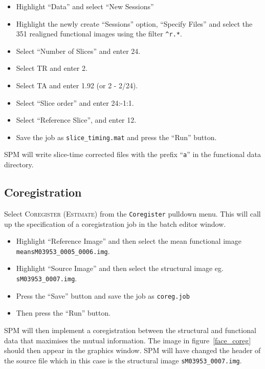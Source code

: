 \begin{itemize}
\item Highlight ``Data'' and select ``New Sessions''
\item Highlight the newly create ``Sessions'' option, ``Specify Files'' and select the 351 realigned functional images using the filter \texttt{\textasciicircum r.*}.
\item Select ``Number of Slices'' and enter 24.
\item Select TR and enter 2.
\item Select TA and enter 1.92 (or 2 - 2/24).
\item Select ``Slice order'' and enter 24:-1:1.
\item Select ``Reference Slice'', and enter 12.
\item Save the job as \texttt{slice\_timing.mat} and press the ``Run'' button.
\end{itemize}
SPM will write slice-time corrected files with the prefix ``\texttt{a}'' in the functional data directory.

\subsection{Coregistration}

Select \textsc{Coregister (Estimate)} from the \texttt{Coregister} pulldown menu. This will call up the specification of a coregistration job in the batch editor 
window. 

\begin{itemize}
\item Highlight ``Reference Image'' and then select the mean functional image \texttt{meansM03953\_0005\_0006.img}.
\item Highlight ``Source Image'' and then select the structural image eg. \texttt{sM03953\_0007.img}.
\item Press the ``Save'' button and save the job as \texttt{coreg.job}
\item Then press the ``Run'' button.
\end{itemize}

SPM will then implement a coregistration between the structural and functional data that maximises the mutual information. The image in figure~\ref{face_coreg} should then appear in the graphics window. SPM will have changed the header of the source file which in this case is the structural image \texttt{sM03953\_0007.img}.

